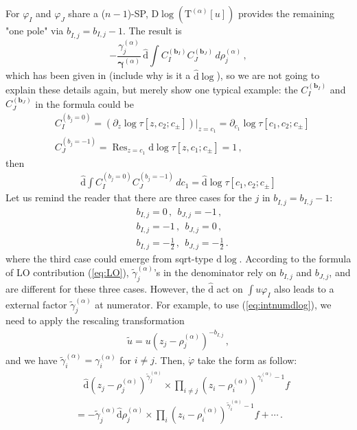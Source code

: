 \documentclass[a4paper,11pt]{article}
\newcommand{\nn}{\nonumber}
\newcommand{\nd}{\mathrm{d}}
\newcommand{\nD}{\mathrm{D}}
\newcommand{\nT}{\mathrm{T}}
\newcommand{\nds}{\hat{\mathrm{d}}}
\def\eref#1{(\ref{#1})}
\DeclareMathOperator{\Res}{Res}
\begin{document}
For $\varphi_I$ and $\varphi_J$ share a ($n-1$)-SP, $\nD \log \left( \nT^{(\alpha)} [u] \right)$ provides the remaining "one pole" via $b_{\dot{I},j}=b_{I,j}-1$.  The result is 
\begin{equation}
    -{\frac{{\gamma}^{(\alpha)}_j }{\bm{{\gamma}}^{(\alpha)}}} \, \nds \int C_{I}^{(\bm{b}_{I} )}C_J^{(\bm{b}_J)} \, d \rho^{(\alpha)}_j \,,
    \label{eq:NMCSPdlog}
\end{equation}
which has been given in \cite{Chen:2023kgw} (include why is it a $\nds \log$), so we are not going to explain these details again, but merely show one typical example: the $C_{I}^{(\bm{b}_{I} )}$ and $C_J^{(\bm{b}_J)}$ in the formula could be 
\begin{align}
&C_{I}^{(b_j=0)} = \left(\partial_{z} \log \tau[z,c_2;c_\pm] \right)\Big|_{z=c_1} = \partial_{c_1} \log \tau[c_1,c_2;c_\pm] \nn\\
&C_J^{(b_j=-1)}=\Res_{z=c_1} \nd \log \tau[z,c_1;c_\pm] =1  \, ,
\end{align}
then 
\begin{align}
\nds \int C_{I}^{(b_j=0)} C_J^{(b_j=-1)} \, d c_1 = \nds \log \tau[c_1,c_2;c_\pm]
\end{align}
Let us remind the reader that there are three cases for the $j$ in $b_{\dot{I},j}=b_{I,j}-1$:
\begin{align}
& b_{I,j}=0 \, , \ \ b_{J,j} = -1 \, , \nn\\
& b_{I,j}=-1 \, , \ \ b_{J,j} = 0 \, ,\nn\\
& b_{I,j}=-\frac{1}{2} \, , \ \ b_{J,j} = -\frac{1}{2} \, .
\end{align}
where the third case could emerge from sqrt-type $\nd \log$. According to the formula of LO contribution \eref{eq:LO}, $\tilde{\gamma}^{(\alpha)}_j$'s in the denominator rely on $b_{I,j}$ and $b_{J,j}$, and are different for these three cases. However, the $\nds$ act on $\int u \varphi_I$ also leads to a external factor $\tilde{\gamma}^{(\alpha)}_j$  at numerator.
For example, to use \eref{eq:intnumdlog}, we need to apply the rescaling transformation
\begin{align}
	\tilde{u} = u (z_j-\rho_j^{(\alpha)})^{-b_{I,j}} \, ,
\end{align}
and we have $\tilde{\gamma}^{(\alpha)}_i = \gamma^{(\alpha)}_i$  for $i\neq j$. 
Then, $\dot{\varphi}$ take the form as follow:
\begin{align}
	&~~~~\nds (z_j-\rho_j^{(\alpha)})^{\tilde{\gamma}^{(\alpha)}_j} \times \prod_{i\neq j}(z_i-\rho_i^{(\alpha)})^{\gamma^{(\alpha)}_i-1} f \nn\\
	&= -\tilde{\gamma}^{(\alpha)}_j \nds \rho_j^{(\alpha)} \times \prod_{i}(z_i-\rho_i^{(\alpha)})^{\tilde{\gamma}^{(\alpha)}_i-1} f + \cdots \, .
\end{align}
\end{document}
